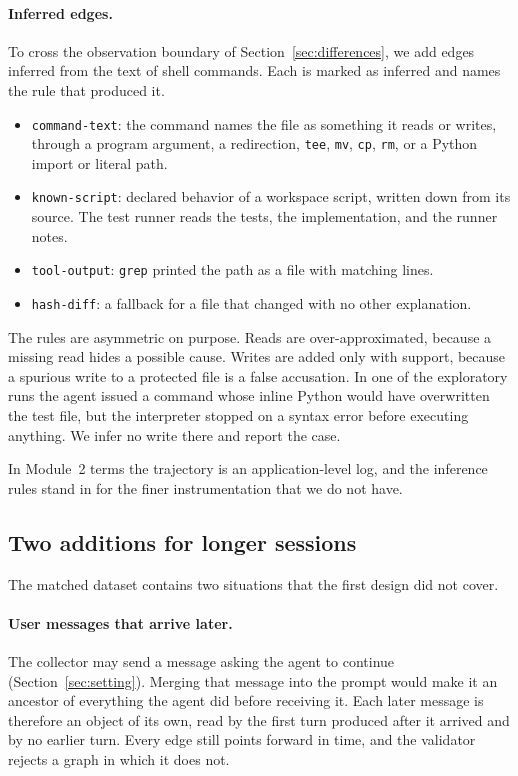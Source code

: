 \paragraph{Inferred edges.}
To cross the observation boundary of Section~\ref{sec:differences}, we add edges inferred from the text of shell commands.
Each is marked as inferred and names the rule that produced it.
\begin{itemize}
  \item \texttt{command-text}: the command names the file as something it reads or writes, through a program argument, a redirection, \texttt{tee}, \texttt{mv}, \texttt{cp}, \texttt{rm}, or a Python import or literal path.
  \item \texttt{known-script}: declared behavior of a workspace script, written down from its source. The test runner reads the tests, the implementation, and the runner notes.
  \item \texttt{tool-output}: \texttt{grep} printed the path as a file with matching lines.
  \item \texttt{hash-diff}: a fallback for a file that changed with no other explanation.
\end{itemize}
The rules are asymmetric on purpose.
Reads are over-approximated, because a missing read hides a possible cause.
Writes are added only with support, because a spurious write to a protected file is a false accusation.
In one of the exploratory runs the agent issued a command whose inline Python would have overwritten the test file, but the interpreter stopped on a syntax error before executing anything.
We infer no write there and report the case.

In Module~2 terms the trajectory is an application-level log, and the inference rules stand in for the finer instrumentation that we do not have.

\subsection{Two additions for longer sessions}
\label{sec:additions}

The matched dataset contains two situations that the first design did not cover.

\paragraph{User messages that arrive later.}
The collector may send a message asking the agent to continue (Section~\ref{sec:setting}).
Merging that message into the prompt would make it an ancestor of everything the agent did before receiving it.
Each later message is therefore an object of its own, read by the first turn produced after it arrived and by no earlier turn.
Every edge still points forward in time, and the validator rejects a graph in which it does not.

